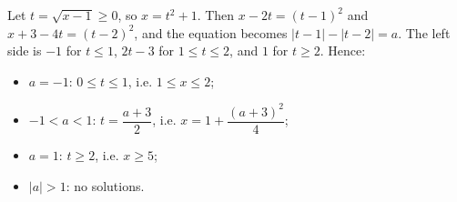 Let $t=\sqrt{x-1}\ge0$, so $x=t^2+1$. Then $x-2t=(t-1)^2$ and $x+3-4t=(t-2)^2$, and the equation becomes $|t-1|-|t-2|=a$. The left side is $-1$ for $t\le1$, $2t-3$ for $1\le t\le2$, and $1$ for $t\ge2$. Hence:
\begin{itemize}
\item $a=-1$: $0\le t\le1$, i.e. $\boxed{1\le x\le2}$;
\item $-1<a<1$: $t=\dfrac{a+3}{2}$, i.e. $\boxed{x=1+\dfrac{(a+3)^2}{4}}$;
\item $a=1$: $t\ge2$, i.e. $\boxed{x\ge5}$;
\item $|a|>1$: no solutions.
\end{itemize}
